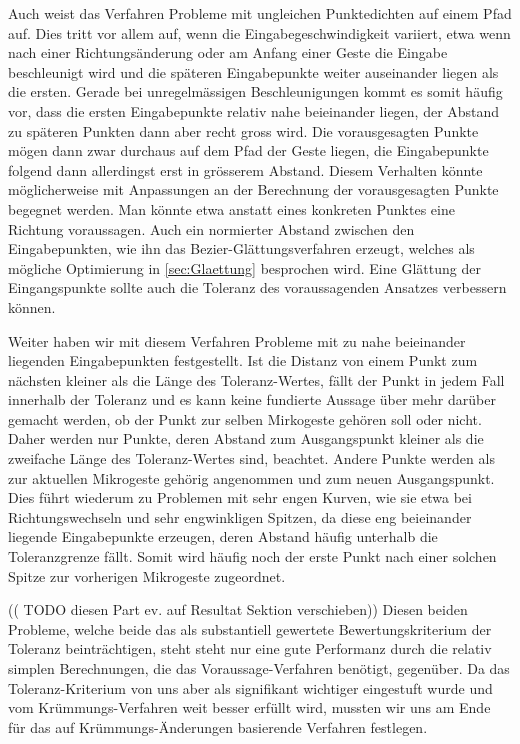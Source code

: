 Auch weist das Verfahren Probleme mit ungleichen Punktedichten auf einem Pfad auf. Dies tritt vor allem auf, wenn die Eingabegeschwindigkeit variiert, etwa wenn nach einer Richtungsänderung oder am Anfang einer Geste die Eingabe beschleunigt wird und die späteren Eingabepunkte weiter auseinander liegen als die ersten. Gerade bei unregelmässigen Beschleunigungen kommt es somit häufig vor, dass die ersten Eingabepunkte relativ nahe beieinander liegen, der Abstand zu späteren Punkten dann aber recht gross wird. Die vorausgesagten Punkte mögen dann zwar durchaus auf dem Pfad der Geste liegen, die Eingabepunkte folgend dann allerdingst erst in grösserem Abstand. Diesem Verhalten könnte möglicherweise mit Anpassungen an der Berechnung der vorausgesagten Punkte begegnet werden. Man könnte etwa anstatt eines konkreten Punktes eine Richtung voraussagen. Auch ein normierter Abstand zwischen den Eingabepunkten, wie ihn das Bezier-Glättungsverfahren erzeugt, welches als mögliche Optimierung in \ref{sec:Glaettung} besprochen wird. Eine Glättung der Eingangspunkte sollte auch die Toleranz des voraussagenden Ansatzes verbessern können.

Weiter haben wir mit diesem Verfahren Probleme mit zu nahe beieinander liegenden Eingabepunkten festgestellt. Ist die Distanz von einem Punkt zum nächsten kleiner als die Länge des Toleranz-Wertes, fällt der Punkt in jedem Fall innerhalb der Toleranz und es kann keine fundierte Aussage über mehr darüber gemacht werden, ob der Punkt zur selben Mirkogeste gehören soll oder nicht. Daher werden nur Punkte, deren Abstand zum Ausgangspunkt kleiner als die zweifache Länge des Toleranz-Wertes sind, beachtet. Andere Punkte werden als zur aktuellen Mikrogeste gehörig angenommen und zum neuen Ausgangspunkt. Dies führt wiederum zu Problemen mit sehr engen Kurven, wie sie etwa bei Richtungswechseln und sehr engwinkligen Spitzen, da diese eng beieinander liegende Eingabepunkte erzeugen, deren Abstand häufig unterhalb die Toleranzgrenze fällt. Somit wird häufig noch der erste Punkt nach einer solchen Spitze zur vorherigen Mikrogeste zugeordnet.

(( TODO diesen Part ev. auf Resultat Sektion verschieben))
Diesen beiden Probleme, welche beide das als substantiell gewertete Bewertungskriterium der Toleranz beinträchtigen, steht steht nur eine gute Performanz durch die relativ simplen Berechnungen, die das Voraussage-Verfahren benötigt, gegenüber. Da das Toleranz-Kriterium von uns aber als signifikant wichtiger eingestuft wurde und vom Krümmungs-Verfahren weit besser erfüllt wird, mussten wir uns am Ende für das auf Krümmungs-Änderungen basierende Verfahren festlegen.

